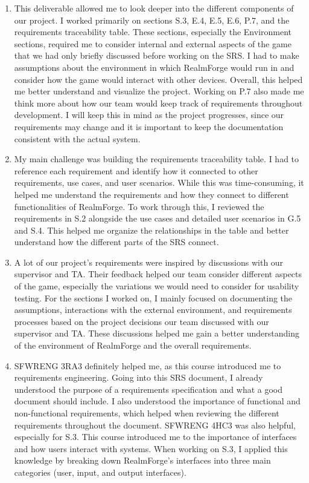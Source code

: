 \documentclass{scrreprt}
\theoremstyle{definition}
\begin{document}
	\begin{enumerate}
		\item This deliverable allowed me to look deeper into the different components of our project. I worked primarily on sections S.3, E.4, E.5, E.6, P.7, and 
		the requirements traceability table. These sections, especially the Environment sections, required me to consider internal and external aspects of the game 
		that we had only briefly discussed before working on the SRS. I had to make assumptions about the environment in which RealmForge would run in and consider how the 
		game would interact with other devices. Overall, this helped me better understand and visualize the project. Working on P.7 also made me think more about how our team 
		would keep track of requirements throughout development. I will keep this in mind as the project progresses, since our requirements may change and it is important to keep 
		the documentation consistent with the actual system.
		\item My main challenge was building the requirements traceability table. I had to reference each requirement and identify how it connected to other requirements, use cases, and user scenarios. While this was time-consuming, it helped me understand the requirements and how they connect to different functionalities of RealmForge. To work through this, I reviewed the requirements in S.2 alongside the use cases and detailed user scenarios in G.5 and S.4. This helped me organize the relationships in the table and better understand how the different parts of the SRS connect.
		\item A lot of our project’s requirements were inspired by discussions with our supervisor and TA. Their feedback helped our team consider different aspects of the game, especially the variations we would need to consider for usability testing. For the sections I worked on, I mainly focused on documenting the assumptions, interactions with the external environment, and requirements processes based on the project decisions our team discussed with our supervisor and TA. These discussions helped me gain a better understanding of the environment of RealmForge and the overall requirements.  
		\item SFWRENG 3RA3 definitely helped me, as this course introduced me to requirements engineering. Going into this SRS document, I already understood the purpose of a requirements specification and what a good document should include. I also understood the importance of functional and non-functional requirements, which helped when reviewing the different requirements throughout the document. SFWRENG 4HC3 was also helpful, especially for S.3. This course introduced me to the importance of interfaces and how users interact with systems. When working on S.3, I applied this knowledge by breaking down RealmForge’s interfaces into three main categories (user, input, and output interfaces). 

\end{enumerate}
\end{document}
